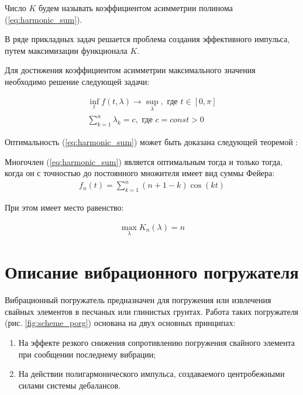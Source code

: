Число $K$ будем называть коэффициентом асимметрии полинома (\ref{eq:harmonic_sum}).

В ряде прикладных задач решается проблема создания эффективного импульса, путем максимизации функционала $K$.

Для достижения коэффициентом асимметрии максимального значения необходимо решение следующей задачи:

\begin{equation}\label{eq:math_task}
    \begin{gathered}
        \inf_t f(t, \lambda) \rightarrow \sup_\lambda, \textrm{ где } t \in [0, \pi]\\
        \sum\limits_{k = 1}^n \lambda_k = c, \textrm{ где } c = const > 0
    \end{gathered}
\end{equation}

Оптимальность (\ref{eq:harmonic_sum}) может быть доказана следующей теоремой \cite{kostin_article}:

\begin{theorem}\label{th:mf}
    Многочлен (\ref{eq:harmonic_sum}) является оптимальным тогда и только
    тогда, когда он с точностью до постоянного множителя имеет вид суммы Фейера:
    \begin{equation}\label{eq:feer}
        \begin{gathered}
            f_n(t) = \sum\limits_{k = 1}^n (n + 1 - k) \cos(kt)
        \end{gathered}
    \end{equation}
    
    При этом имеет место равенство:
    
    \begin{equation}\label{eq:max_lambda}
        \begin{gathered}
            \max \limits_{\lambda} K_n(\lambda) = n
        \end{gathered}
    \end{equation}
\end{theorem}

\clearpage
\section{Описание вибрационного погружателя}
\label{chapter:pogr}

Вибрационный погружатель предназначен для погружения или извлечения свайных элементов в песчаных или глинистых грунтах.
Работа таких погружателя (рис. \ref{fig:scheme_porg}) основана на двух основных принципах:
\begin{enumerate} 
    \item На эффекте резкого снижения сопротивлению погружения свайного элемента при сообщении последнему вибрации;
    \item На действии полигармонического импульса, создаваемого центробежными силами системы дебалансов.
\end{enumerate}

